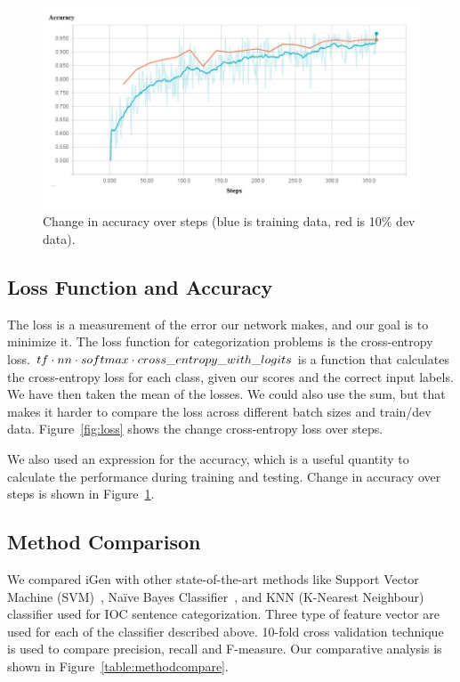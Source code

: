 \begin{figure}[tb]
\centering
\includegraphics [width=\linewidth]{Accuracyoversteps.jpg}
\caption{Change in accuracy over steps (blue is training data, red is 10\% dev data).}
\label{fig:accuracy}
\end{figure}

\subsection{Loss Function and Accuracy}


The loss is a measurement of the error our network makes, and our goal is to minimize it. The loss function for categorization problems is the cross-entropy loss.
$tf\cdot{nn}\cdot{softmax}\cdot{cross}\char`_entropy\char`_with\char`_logits$ is a function that calculates the cross-entropy loss for each class, given our scores and the correct input labels. We have then taken the mean of the losses. We could also use the sum, but that makes it harder to compare the loss across different batch sizes and train/dev data. Figure~\ref{fig:loss} shows the change cross-entropy loss over steps.

We also used an expression for the accuracy, which is a useful quantity to calculate the performance during training and testing. Change in accuracy over steps is shown in Figure~\ref{fig:accuracy}.

\subsection{Method Comparison}



We compared iGen with other state-of-the-art methods like Support Vector Machine (SVM)~\cite{cortes}, Naïve Bayes Classifier~\cite{nir}, and KNN (K-Nearest Neighbour)~\cite{liao1} classifier used for IOC sentence categorization. Three type of feature vector are used for each of the classifier described above. 10-fold cross validation technique is used to compare precision, recall and F-measure. Our comparative analysis is shown in Figure~\ref{table:methodcompare}.

